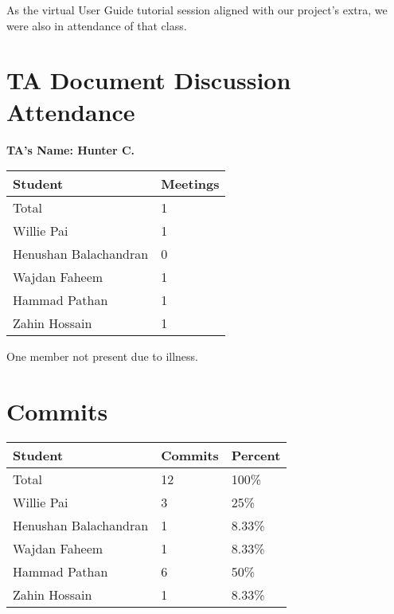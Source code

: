 \documentclass{article}
\begin{document}

As the virtual User Guide tutorial session aligned with our project's extra, we were also in attendance of that class.

\section{TA Document Discussion Attendance}


\noindent \textbf{TA's Name: Hunter C.}

\begin{table}[H]
\centering
\begin{tabular}{ll}
\toprule
\textbf{Student} & \textbf{Meetings}\\
\midrule
Total & 1\\
Willie Pai & 1\\
Henushan Balachandran & 0\\
Wajdan Faheem & 1\\
Hammad Pathan & 1\\
Zahin Hossain & 1\\
\bottomrule
\end{tabular}
\end{table}


One member not present due to illness.

\section{Commits}


\begin{table}[H]
\centering
\begin{tabular}{lll}
\toprule
\textbf{Student} & \textbf{Commits} & \textbf{Percent}\\
\midrule
Total & 12 & 100\% \\
Willie Pai & 3 & 25\% \\
Henushan Balachandran & 1 & 8.33\% \\
Wajdan Faheem & 1 & 8.33\% \\
Hammad Pathan & 6 & 50\% \\
Zahin Hossain & 1 & 8.33\% \\
\bottomrule
\end{tabular}
\end{table}
\end{document}
